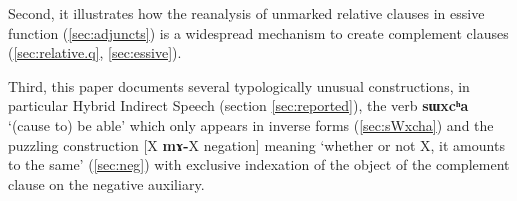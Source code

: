 \documentclass[oneside,a4paper,11pt]{article}
\newcommand{\ipa}[1]{\textbf{\phon#1}} %
\newcommand{\jpg}[2]{\ipa{#1} `#2'} %
\begin{document}
Second, it illustrates how the reanalysis of unmarked relative clauses in essive function (\ref{sec:adjuncts}) is a widespread mechanism to create complement clauses (\ref{sec:relative.q}, \ref{sec:essive}).

Third, this paper documents several typologically unusual constructions, in particular Hybrid Indirect Speech (section \ref{sec:reported}), the verb \jpg{sɯxcʰa}{(cause to) be able} which only appears in inverse forms (\ref{sec:sWxcha}) and the puzzling construction  [X \ipa{mɤ-}X negation] meaning `whether or not X, it amounts to the same' (\ref{sec:neg}) with exclusive indexation of the object of the complement clause on the negative auxiliary.



\end{document}
